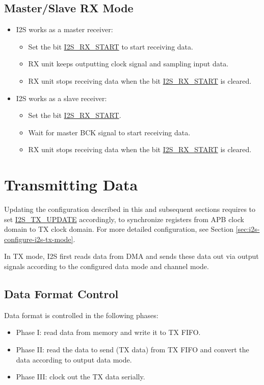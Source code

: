 \documentclass[main\_\_EN.tex]{subfiles}
\begin{document}
\subsection{Master/Slave RX Mode}
\begin{itemize}
    \item I2S works as a master receiver:
    \begin{itemize}
        \item Set the bit  \hyperref[fielddesc:I2SRXSTART]{I2S\_RX\_START} to start receiving data.
        \item RX unit keeps outputting clock signal and sampling input data.
        \item RX unit stops receiving data when the bit  \hyperref[fielddesc:I2SRXSTART]{I2S\_RX\_START} is cleared.
    \end{itemize}
    \item I2S works as a slave receiver:
     \begin{itemize}
        \item Set the bit  \hyperref[fielddesc:I2SRXSTART]{I2S\_RX\_START}.
        \item Wait for master BCK signal to start receiving data.
        \item RX unit stops receiving data when the bit \hyperref[fielddesc:I2SRXSTART]{I2S\_RX\_START} is cleared.
       
    \end{itemize}
\end{itemize}

\section{Transmitting Data}\label{sec:i2s-tx-data}

\begin{tiplisting}
Updating the configuration described in this and subsequent sections requires to set \hyperref[fielddesc:I2STXUPDATE]{I2S\_TX\_UPDATE} accordingly, to synchronize registers from APB clock domain to TX clock domain. For more detailed configuration, see Section \ref{sec:i2s-configure-i2s-tx-mode}.
\end{tiplisting}

\vspace{-2em}
In TX mode, I2S first reads data from DMA and sends these data out via output signals according to the configured data mode and channel mode.
\subsection{Data Format Control}
Data format is controlled in the following phases:
\begin{itemize}
    \item Phase I: read data from memory and write it to TX FIFO.
    \item Phase II: read the data to send (TX data) from TX FIFO and convert the data according to output data mode.
    \item Phase III: clock out the TX data serially.
\end{itemize}
\end{document}
